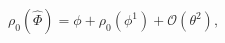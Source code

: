\begin{equation}
    \rho_0(\widehat \Phi)=\phi+\rho_0(\phi^1)+\mathcal{O}(\theta^2),
\end{equation}

